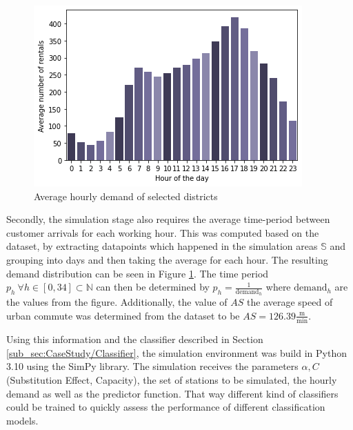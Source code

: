 \begin{figure}[htbp]
  \centering
  \includegraphics[width=.5\linewidth]{./Figures/hourly-demand.png}
  \caption{Average hourly demand of selected districts}
  \label{fig:Demand}
\end{figure}

Secondly, the simulation stage also requires the average time-period between customer arrivals for each working hour.
This was computed based on the dataset, by extracting datapoints which happened in the simulation areas $\mathbb{S}$ 
and grouping into days and then taking the average for each hour. The resulting
demand distribution can be seen in Figure \ref{fig:Demand}. The time period $p_h \ \forall h \in [0, 34] \subset \mathbb{N}$
can then be determined by $p_h = \frac{1}{\text{demand}_h}$ where $\text{demand}_h$ are the values from the figure.
Additionally, the value of $AS$ the average speed of urban commute was determined from the dataset to be $AS = 126.39 \frac{\text{m}}{\text{min}}$.

Using this information and the classifier described in Section \ref{sub_sec:CaseStudy/Classifier}, the simulation environment
was build in Python 3.10 using the SimPy library. The simulation receives the parameters $\alpha, C$ (Substitution Effect, Capacity),
the set of stations to be simulated, the hourly demand as well as the predictor function. That way different kind of classifiers
could be trained to quickly assess the performance of different classification models. 